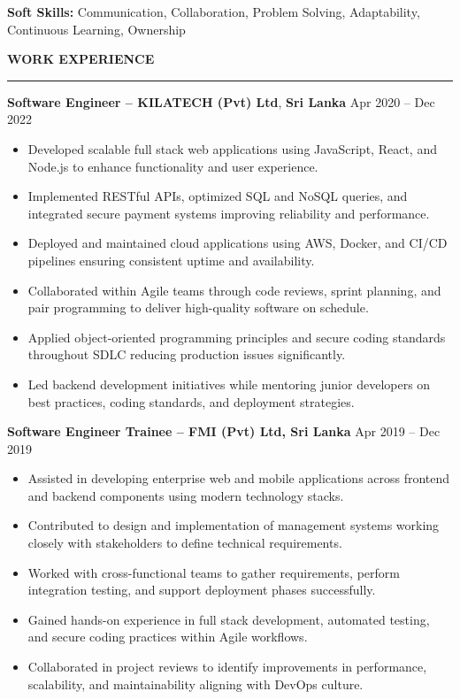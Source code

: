 \documentclass[10pt,letterpaper]{article}
\begin{document}
\textbf{Soft Skills:} Communication, Collaboration, Problem Solving, Adaptability, Continuous Learning, Ownership

\vspace{8pt}

\textbf{WORK EXPERIENCE}\\[-8pt]
\noindent\rule{\textwidth}{1pt}

\vspace{-2pt}

\textbf{Software Engineer -- KILATECH (Pvt) Ltd}, \textbf{Sri Lanka} \hfill Apr 2020 -- Dec 2022

\vspace{-1pt}

\begin{itemize}
\item Developed scalable full stack web applications using JavaScript, React, and Node.js to enhance functionality and user experience.
\item Implemented RESTful APIs, optimized SQL and NoSQL queries, and integrated secure payment systems improving reliability and performance.
\item Deployed and maintained cloud applications using AWS, Docker, and CI/CD pipelines ensuring consistent uptime and availability.
\item Collaborated within Agile teams through code reviews, sprint planning, and pair programming to deliver high-quality software on schedule.
\item Applied object-oriented programming principles and secure coding standards throughout SDLC reducing production issues significantly.
\item Led backend development initiatives while mentoring junior developers on best practices, coding standards, and deployment strategies.
\end{itemize}

\textbf{Software Engineer Trainee -- FMI (Pvt) Ltd, Sri Lanka} \hfill Apr 2019 -- Dec 2019

\vspace{-1pt}

\begin{itemize}
\item Assisted in developing enterprise web and mobile applications across frontend and backend components using modern technology stacks.
\item Contributed to design and implementation of management systems working closely with stakeholders to define technical requirements.
\item Worked with cross-functional teams to gather requirements, perform integration testing, and support deployment phases successfully.
\item Gained hands-on experience in full stack development, automated testing, and secure coding practices within Agile workflows.
\item Collaborated in project reviews to identify improvements in performance, scalability, and maintainability aligning with DevOps culture.
\end{itemize}
\end{document}
